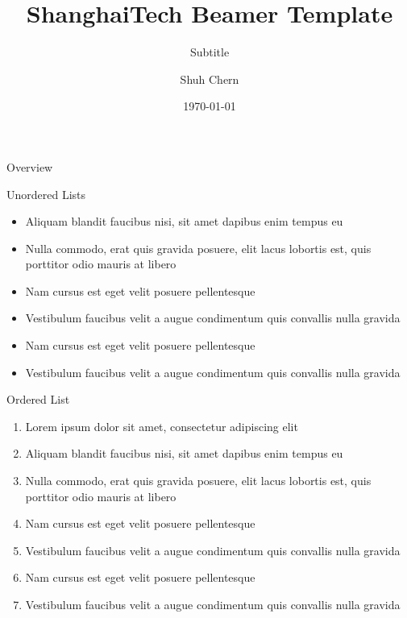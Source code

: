\documentclass[aspectratio=169,xcolor=dvipsnames, t]{beamer}
\title[short title]{ShanghaiTech Beamer Template} %
\subtitle{Subtitle}
\author[Surname]{Shuh Chern}
\institute[IMS ShanghaiTech]{Institute of Mathematical Science\newline ShanghaiTech University}
\date{\today} %
\begin{document}
\maketitlepage

\begin{frame}[t]{Overview}
    \tableofcontents
\end{frame}


\begin{frame}{Unordered Lists}
    \begin{itemize}
        \item Aliquam blandit faucibus nisi, sit amet dapibus enim tempus eu
        \item Nulla commodo, erat quis gravida posuere, elit lacus lobortis est, quis porttitor odio mauris at libero
        \item Nam cursus est eget velit posuere pellentesque
        \item Vestibulum faucibus velit a augue condimentum quis convallis nulla gravida
        \item Nam cursus est eget velit posuere pellentesque
        \item Vestibulum faucibus velit a augue condimentum quis convallis nulla gravida
    \end{itemize}
\end{frame}

\begin{frame}{Ordered List}
    \begin{enumerate}
        \item Lorem ipsum dolor sit amet, consectetur adipiscing elit
        \item Aliquam blandit faucibus nisi, sit amet dapibus enim tempus eu
        \item Nulla commodo, erat quis gravida posuere, elit lacus lobortis est, quis porttitor odio mauris at libero
        \item Nam cursus est eget velit posuere pellentesque
        \item Vestibulum faucibus velit a augue condimentum quis convallis nulla gravida
        \item Nam cursus est eget velit posuere pellentesque
        \item Vestibulum faucibus velit a augue condimentum quis convallis nulla gravida
    \end{enumerate}
\end{frame}
\end{document}
